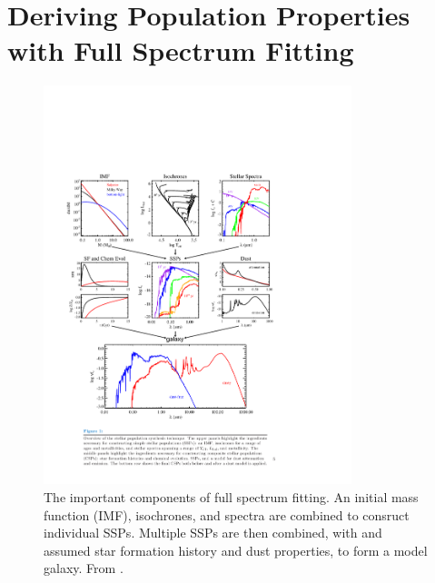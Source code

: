 \section{Deriving Population Properties with Full Spectrum Fitting}
\label{intro:sec:SSP}
\begin{figure}
  \centering
  \includegraphics[width=0.8\textwidth]{Introduction/figs/conroy_13.pdf}
  \caption[Schematic of full spectrum
  fitting]{\fixspacing\label{intro:fig:conroy}The important components
    of full spectrum fitting. An initial mass function (IMF),
    isochrones, and spectra are combined to consruct individual
    SSPs. Multiple SSPs are then combined, with and assumed star
    formation history and dust properties, to form a model
    galaxy. From \citet{Conroy13}.}
\end{figure}

